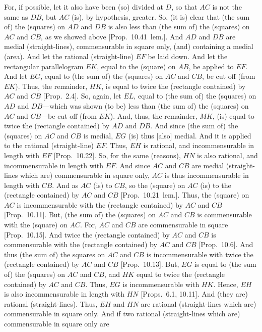 \begin{Parallel}{}{}
{For, if possible, let it also have  been (so) divided at $D$, so that $AC$ is not the
same as $DB$, but $AC$ (is), by hypothesis, greater. So, (it is)  clear that
(the sum of) the (squares) on $AD$ and $DB$ is also less than (the sum of)
the (squares) on $AC$ and $CB$, as we showed above [Prop.~10.41~lem.].  And $AD$ and $DB$ are medial (straight-lines), commensurable in square only, (and)
containing a medial (area). And let the rational (straight-line) $EF$
be laid down. And let the rectangular parallelogram $EK$, equal to the (square) on $AB$, be applied to $EF$. And let $EG$, equal to
(the sum of) the (squares) on $AC$ and $CB$, be cut  off (from $EK$).
Thus, the remainder, $HK$, is equal to twice the (rectangle contained)
by $AC$ and $CB$ [Prop.~2.4]. So, again,
let $EL$, equal to  (the sum of) the (squares) on  $AD$ and $DB$---which was shown (to be) less than (the sum of) the (squares) on $AC$ and
$CB$---be cut off (from $EK$). And, thus, the remainder, $MK$,
(is) equal to twice the (rectangle contained) by $AD$ and $DB$. 
And since (the sum of) the (squares) on $AC$ and $CB$ is medial, $EG$ (is) thus [also]
medial. And it is applied to the rational (straight-line) $EF$. Thus, $EH$
is rational, and incommensurable in length with $EF$ [Prop.~10.22]. So, for the same (reasons), $HN$
is also rational, and incommensurable in length with $EF$. And since 
$AC$ and $CB$  are medial (straight-lines which are) commensurable
in square only, $AC$ is thus incommensurable in length with $CB$.
And as $AC$ (is) to $CB$, so the (square) on $AC$ (is) to the
(rectangle contained) by $AC$ and $CB$ [Prop.~10.21~lem.]. Thus, the (square) on $AC$ is
incommensurable with the (rectangle contained) by $AC$ and $CB$
[Prop.~10.11]. But, (the sum of) the (squares)
on $AC$ and $CB$ is commensurable with the (square) on $AC$.
For, $AC$ and $CB$ are commensurable in square [Prop.~10.15]. And
twice the (rectangle contained) by $AC$ and $CB$ is commensurable with the (rectangle contained) by $AC$ and $CB$ [Prop.~10.6]. And thus
(the sum of) the squares on $AC$ and $CB$ is incommensurable with twice
the (rectangle contained) by $AC$ and $CB$ [Prop.~10.13]. But, $EG$ is equal to (the sum
of) the (squares) on $AC$ and $CB$, and $HK$ equal to twice the (rectangle
contained) by $AC$ and $CB$. Thus, $EG$ is incommensurable
with $HK$. Hence, $EH$ is also incommensurable in length with  $HN$
[Props.~6.1, 10.11].
And (they are)  rational (straight-lines). Thus, $EH$ and $HN$ are rational
(straight-lines which are) commensurable in square only. And if two
rational (straight-lines which are) commensurable in square only are
}
\end{Parallel}
